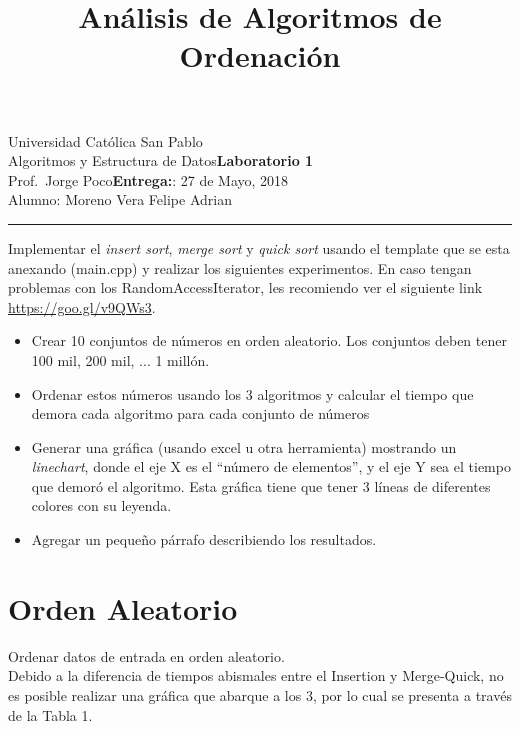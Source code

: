 \documentclass{article}
\title{Análisis de Algoritmos de Ordenación}
\date{}
\newcommand{\assignment}{Laboratorio 1}
\newcommand{\duedate}{27 de Mayo, 2018}
\begin{document}
Universidad Católica San Pablo\hfill\\
Algoritmos y Estructura de Datos\hfill\textbf{\assignment}\\
Prof.\ Jorge Poco\hfill\textbf{Entrega:}: \duedate\\
Alumno: Moreno Vera Felipe Adrian
\smallskip\hrule\bigskip

{\let\newpage\relax\maketitle}
\maketitle


Implementar el \emph{insert sort}, \emph{merge sort} y \emph{quick sort} usando el template que se esta anexando (main.cpp) y realizar los siguientes experimentos. En caso tengan problemas con los RandomAccessIterator, les recomiendo ver el siguiente link \url{https://goo.gl/v9QWs3}.

\begin{itemize}
  \item Crear 10 conjuntos de números en orden aleatorio. Los conjuntos deben tener {100 mil, 200 mil, ... 1 millón}. 
  \item Ordenar estos números usando los 3 algoritmos y calcular el tiempo que demora cada algoritmo para cada conjunto de números
  \item Generar una gráfica (usando excel u otra herramienta) mostrando un \emph{linechart}, donde el eje X es el “número de elementos”, y el  eje Y sea el tiempo que demoró el algoritmo. Esta gráfica tiene que tener 3 líneas de diferentes colores con su leyenda. 
  \item Agregar un pequeño párrafo describiendo los resultados.
\end{itemize}

\section{Orden Aleatorio}
Ordenar datos de entrada en orden aleatorio.\\
Debido a la diferencia de tiempos abismales entre el Insertion y Merge-Quick, no es posible realizar una gráfica que abarque a los 3, por lo cual se presenta a través de la Tabla 1.\\
\end{document}
